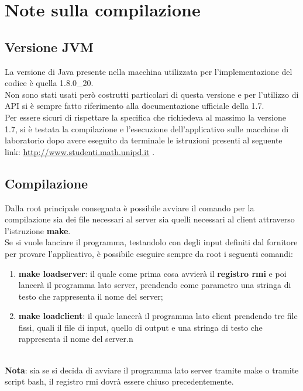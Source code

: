 % 
%
%

\section{Note sulla compilazione} %
\label{sec:note_sulla_compilazione}
	\subsection{Versione JVM}
	La versione di Java presente nella macchina utilizzata per l'implementazione del codice è quella 1.8.0\_20. \\
	Non sono stati usati però costrutti particolari di questa versione e per l'utilizzo di API si è sempre fatto riferimento alla documentazione ufficiale della 1.7. \\
	Per essere sicuri di rispettare la specifica che richiedeva al massimo la versione 1.7, si è testata la compilazione e l'esecuzione dell'applicativo sulle macchine di laboratorio dopo avere eseguito da terminale le istruzioni presenti al seguente link: \href{http://www.studenti.math.unipd.it/index.php?id=corsi#c620}{http://www.studenti.math.unipd.it} .

	\subsection{Compilazione}
	Dalla root principale consegnata è possibile avviare il comando per la compilazione sia dei file necessari al server sia quelli necessari al client attraverso l'istruzione \textbf{make}. \\
	Se si vuole lanciare il programma, testandolo con degli input definiti dal fornitore per provare l'applicativo, è possibile eseguire sempre da root i seguenti comandi:
		\begin{enumerate}
			\item \textbf{make loadserver}: il quale come prima cosa avvierà il \textbf{registro rmi} e poi lancerà il programma lato server, prendendo come parametro una stringa di testo che rappresenta il nome del server;
			\item \textbf{make loadclient}: il quale lancerà il programma lato client prendendo tre file fissi, quali il file di input, quello di output e una stringa di testo che rappresenta il nome del server.n
		\end{enumerate}
	\noindent
	\\ 
	\textbf{Nota}: sia se si decida di avviare il programma lato server tramite make o tramite script bash, il registro rmi dovrà essere chiuso precedentemente. \\ \\
	
